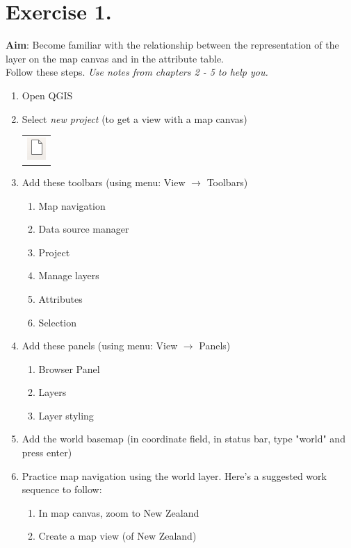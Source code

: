 \documentclass{article}
\begin{document}
\newpage

\section{Exercise 1.}
\textbf{Aim}: Become familiar with the relationship between the representation of the layer on the map canvas and in the attribute table.\\

Follow these steps. \emph{Use notes from chapters 2 - 5 to help you.}

\begin{enumerate}
	\item Open QGIS
	\item Select \emph{new project} (to get a view with a map canvas)
	\begin{tabular}{@{}c@{}}\includegraphics[width=3ex]{images/new_project_icon.png}\end{tabular}
	\item Add these toolbars (using menu: View $\rightarrow$ Toolbars)
	\begin{enumerate}
		\item
		Map navigation
		\item
		Data source manager
		\item
		Project
		\item
		Manage layers
		\item
		Attributes
		\item 
		Selection
	\end{enumerate}
	\item Add these panels (using menu: View $\rightarrow$ Panels)
	\begin{enumerate}
		\item
		Browser Panel
		\item
		Layers
		\item
		Layer styling
	\end{enumerate}
	\item Add the world basemap (in coordinate field, in status bar, type "world" and press enter)
	\item Practice map navigation using the world layer. Here's a suggested work sequence to follow:
	\begin{enumerate}
		\item In map canvas, zoom to New Zealand
		\item Create a map view (of New Zealand)

\end{enumerate}
\end{enumerate}
\end{document}
